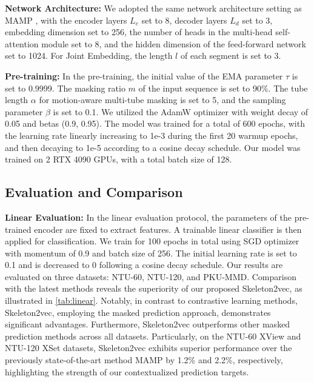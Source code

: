 \noindent \textbf{Network Architecture:}
We adopted the same network architecture setting as MAMP \cite{mao2023masked}, with the
encoder layers $L_{e}$ set to 8, decoder layers $L_{d}$ set to 3, embedding dimension
set to 256, the number of heads in the multi-head self-attention module set to 8, and
the hidden dimension of the feed-forward network set to 1024. For Joint Embedding,
the length $l$ of each segment is set to 3.

\noindent \textbf{Pre-training:}
In the pre-training, the initial value of the EMA parameter $\tau$ is set to 0.9999.
The masking ratio $m$ of the input sequence is set to 90\%.
The tube length $\alpha$ for motion-aware multi-tube masking is set to 5,
and the sampling parameter $\beta$ is set to 0.1. We utilized the AdamW optimizer
with weight decay of 0.05 and betas (0.9, 0.95). The model was trained for a total of
600 epochs, with the learning rate linearly increasing to 1e-3 during the first 20
warmup epochs, and then decaying to 1e-5 according to a cosine decay schedule.
Our model was trained on 2 RTX 4090 GPUs, with a total batch size of 128.

\subsection{Evaluation and Comparison}
\noindent \textbf{Linear Evaluation:}
In the linear evaluation protocol, the parameters of the pre-trained encoder are
fixed to extract features. A trainable linear classifier is then applied for
classification. We train for 100 epochs in total using SGD optimizer with momentum of
0.9 and batch size of 256.
The initial learning rate is set to 0.1 and is decreased to 0 following a
cosine decay schedule.
Our results are evaluated on three datasets: NTU-60, NTU-120, and PKU-MMD.
Comparison with the latest methods reveals the superiority of our proposed Skeleton2vec,
as illustrated in \cref{tab:linear}. Notably, in contrast to contrastive learning
methods, Skeleton2vec, employing the masked prediction approach, demonstrates significant advantages.
Furthermore, Skeleton2vec outperforms other masked prediction methods across all datasets.
Particularly, on the NTU-60 XView and NTU-120 XSet datasets, Skeleton2vec exhibits
superior performance over the previously state-of-the-art method MAMP by 1.2\% and 2.2\%,
respectively, highlighting the strength of our contextualized prediction targets.

